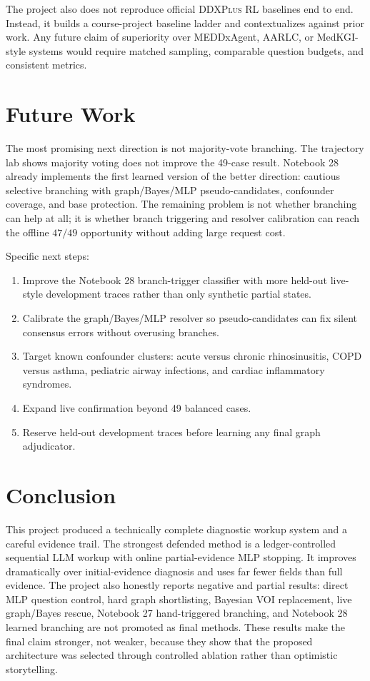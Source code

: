 \documentclass[11pt]{article}
\newcommand{\ddx}{\textsc{DDXPlus}}
\newcommand{\mlp}{\textsc{MLP}}
\newcommand{\llm}{\textsc{LLM}}
\begin{document}
The project also does not reproduce official \ddx{} RL baselines end to end. Instead, it builds a course-project baseline ladder and contextualizes against prior work. Any future claim of superiority over MEDDxAgent, AARLC, or MedKGI-style systems would require matched sampling, comparable question budgets, and consistent metrics.

\section{Future Work}

The most promising next direction is not majority-vote branching. The trajectory lab shows majority voting does not improve the 49-case result. Notebook 28 already implements the first learned version of the better direction: cautious selective branching with graph/Bayes/MLP pseudo-candidates, confounder coverage, and base protection. The remaining problem is not whether branching can help at all; it is whether branch triggering and resolver calibration can reach the offline $47/49$ opportunity without adding large request cost.

Specific next steps:
\begin{enumerate}[leftmargin=*]
    \item Improve the Notebook 28 branch-trigger classifier with more held-out live-style development traces rather than only synthetic partial states.
    \item Calibrate the graph/Bayes/MLP resolver so pseudo-candidates can fix silent consensus errors without overusing branches.
    \item Target known confounder clusters: acute versus chronic rhinosinusitis, COPD versus asthma, pediatric airway infections, and cardiac inflammatory syndromes.
    \item Expand live confirmation beyond 49 balanced cases.
    \item Reserve held-out development traces before learning any final graph adjudicator.
\end{enumerate}

\section{Conclusion}

This project produced a technically complete diagnostic workup system and a careful evidence trail. The strongest defended method is a ledger-controlled sequential \llm{} workup with online partial-evidence \mlp{} stopping. It improves dramatically over initial-evidence diagnosis and uses far fewer fields than full evidence. The project also honestly reports negative and partial results: direct MLP question control, hard graph shortlisting, Bayesian VOI replacement, live graph/Bayes rescue, Notebook 27 hand-triggered branching, and Notebook 28 learned branching are not promoted as final methods. These results make the final claim stronger, not weaker, because they show that the proposed architecture was selected through controlled ablation rather than optimistic storytelling.
\end{document}
